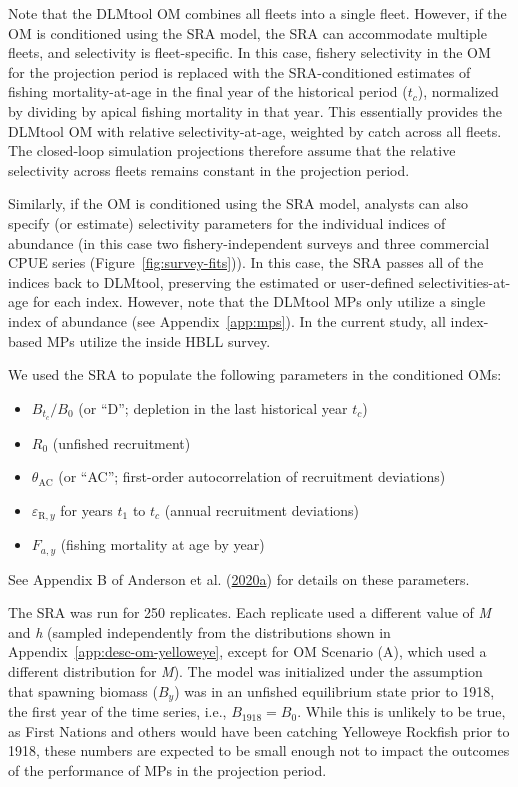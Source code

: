 \documentclass[11pt]{book}
\begin{document}
Note that the DLMtool OM combines all fleets into a single fleet. However, if the OM is conditioned using the SRA model, the SRA can accommodate multiple fleets, and selectivity is fleet-specific. In this case, fishery selectivity in the OM for the projection period is replaced with the SRA-conditioned estimates of fishing mortality-at-age in the final year of the historical period (\(t_c\)), normalized by dividing by apical fishing mortality in that year. This essentially provides the DLMtool OM with relative selectivity-at-age, weighted by catch across all fleets. The closed-loop simulation projections therefore assume that the relative selectivity across fleets remains constant in the projection period.

Similarly, if the OM is conditioned using the SRA model, analysts can also specify (or estimate) selectivity parameters for the individual indices of abundance (in this case two fishery-independent surveys and three commercial CPUE series (Figure~\ref{fig:survey-fits})). In this case, the SRA passes all of the indices back to DLMtool, preserving the estimated or user-defined selectivities-at-age for each index. However, note that the DLMtool MPs only utilize a single index of abundance (see Appendix~\ref{app:mps}). In the current study, all index-based MPs utilize the inside HBLL survey.

We used the SRA to populate the following parameters in the conditioned OMs:
\begin{itemize}

\item
  \(B_{t_c}/B_0\) (or ``D''; depletion in the last historical year \(t_c\))
\item
  \(R_0\) (unfished recruitment)
\item
  \(\theta_\textrm{AC}\) (or ``AC''; first-order autocorrelation of recruitment deviations)
\item
  \(\varepsilon_{\textrm{R},y}\) for years \(t_1\) to \(t_c\) (annual recruitment deviations)
\item
  \(F_{a,y}\) (fishing mortality at age by year)
\end{itemize}
See Appendix B of Anderson et al. (\protect\hyperlink{ref-anderson2020gfmp}{2020}\protect\hyperlink{ref-anderson2020gfmp}{a}) for details on these parameters.

The SRA was run for 250 replicates. Each replicate used a different value of \emph{M} and \emph{h} (sampled independently from the distributions shown in Appendix~\ref{app:desc-om-yelloweye}, except for OM Scenario (A), which used a different distribution for \emph{M}). The model was initialized under the assumption that spawning biomass (\(B_y\)) was in an unfished equilibrium state prior to 1918, the first year of the time series, i.e., \(B_{1918} = B_0\). While this is unlikely to be true, as First Nations and others would have been catching Yelloweye Rockfish prior to 1918, these numbers are expected to be small enough not to impact the outcomes of the performance of MPs in the projection period.
\end{document}
